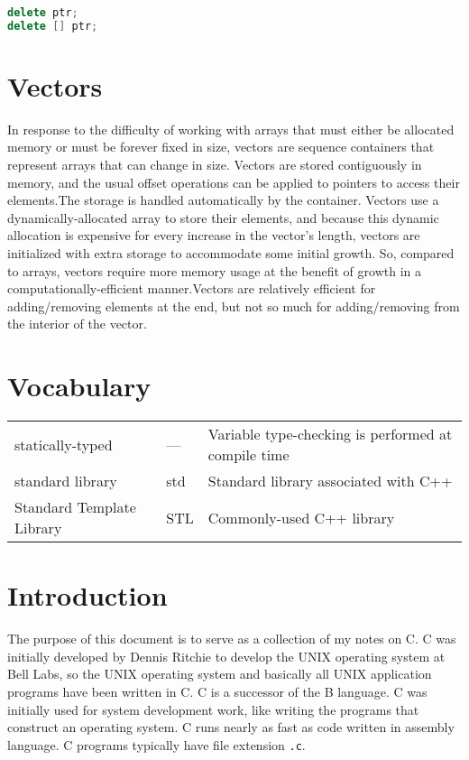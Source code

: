 \documentclass[10pt]{article}
\begin{document}
\begin{lstlisting}[language=C++]
delete ptr;
delete [] ptr;
\end{lstlisting}

\section{Vectors}

In response to the difficulty of working with arrays that must either be allocated memory or must be forever fixed in size, vectors are sequence containers that represent arrays that can change in size. Vectors are stored contiguously in memory, and the usual offset operations can be applied to pointers to access their elements.The storage is handled automatically by the container. Vectors use a dynamically-allocated array to store their elements, and because this dynamic allocation is expensive for every increase in the vector's length, vectors are initialized with extra storage to accommodate some initial growth. So, compared to arrays, vectors require more memory usage at the benefit of growth in a computationally-efficient manner.Vectors are relatively efficient for adding/removing elements at the end, but not so much for adding/removing from the interior of the vector.




\section{Vocabulary}

\begin{tabular}{l l l}
statically-typed & --- & Variable type-checking is performed at compile time\\
standard library & std & Standard library associated with C++\\
Standard Template Library & STL & Commonly-used C++ library\\
\end{tabular}

\clearpage

\section{Introduction}

The purpose of this document is to serve as a collection of my notes on C. C was initially developed by Dennis Ritchie to develop the UNIX operating system at Bell Labs, so the UNIX operating system and basically all UNIX application programs have been written in C. C is a successor of the B language. C was initially used for system development work, like writing the programs that construct an operating system. C runs nearly as fast as code written in assembly language. C programs typically have file extension {\tt .c}. 
\end{document}
